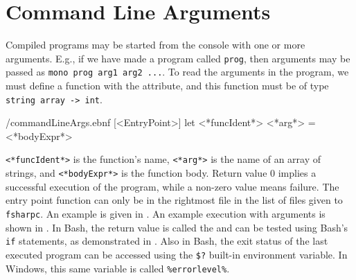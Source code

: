 \documentclass[fsharpNotes.tex]{subfiles}
\begin{document}
\section{Command Line Arguments}
Compiled programs may be started from the console with one or more arguments. E.g., if we have made a program called \lstinline[language=console]{prog}, then arguments may be passed as \lstinline[language=console]{mono prog arg1 arg2 ...}. To read the arguments in the program, we must define a function with the  attribute, and this function must be of type \lstinline{string array -> int}.
%
\begin{verbatimwrite}{\ebnf/commandLineArgs.ebnf}
[<EntryPoint>]
let <*funcIdent*> <*arg*> =
  <*bodyExpr*>
\end{verbatimwrite}
%
\lstinline[language=syntax]{<*funcIdent*>} is the function's name, \lstinline[language=syntax]{<*arg*>} is the name of an array of strings, and \lstinline[language=syntax]{<*bodyExpr*>} is the function body. Return value 0 implies a successful execution of the program, while a non-zero value means failure. The entry point function can only be in the rightmost file in the list of files given to \lstinline[language=console]{fsharpc}. An example is given in .
%
%
An example execution with arguments is shown in .
%
%
%
In Bash, the return value is called the  and can be tested using Bash's \lstinline[language=console]{if} statements, as demonstrated in .
%
%
%
Also in Bash, the exit status of the last executed program can be accessed using the \lstinline[language=console]{$?} %
built-in environment variable. In Windows, this same variable is called \lstinline[language=console]{%errorlevel%}.
\end{document}
